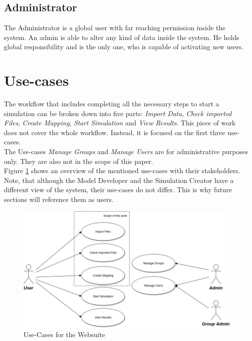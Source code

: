 \subsection{Administrator}
The Administrator is a global user with far reaching permission inside the system. An admin is able to alter any kind of data inside the system. He holds global responsibility and is the only one, who is capable of activating new users.


\section{Use-cases}
The workflow that includes completing all the necessary steps to start a simulation can be broken down into five parts: \textit{Import Data}, \textit{Check imported Files}, \textit{Create Mapping}, \textit{Start Simulation} and \textit{View Results}. This piece of work does not cover the whole workflow. Instead, it is focused on the first three use-cases.\\
The Use-cases \textit{Manage Groups} and \textit{Manage Users} are for administrative purposes only. They are also not in the scope of this paper.\\
Figure \ref{fig:use-cases} shows an overview of the mentioned use-cases with their stakeholders. Note, that although the Model Developer and the Simulation Creator have a different view of the system, their use-cases do not differ. This is why future sections will reference them as users.
\begin{figure}[H]
	\centering\includegraphics[width=1\textwidth]{res/Use-Cases_reduced}
	\caption{Use-Cases for the Websuite}
	\label{fig:use-cases}
\end{figure}


